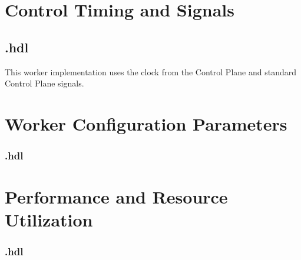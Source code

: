\section*{Control Timing and Signals}
\subsection*{\comp.hdl}
\begin{flushleft}
This worker implementation uses the clock from the Control Plane and standard Control Plane signals.
\end{flushleft}

\begin{landscape}
\section*{Worker Configuration Parameters}
\subsubsection*{\comp.hdl}
%
\section*{Performance and Resource Utilization}
\subsubsection*{\comp.hdl}
%
\end{landscape}

